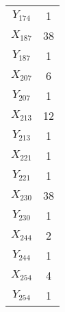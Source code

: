 \documentclass[a4paper,10pt]{article}
\begin{document}
\begin{center}
\begin{longtable}{cc}
$Y_{174}$ & 1 \\
$X_{187}$ & 38 \\
$Y_{187}$ & 1 \\
$X_{207}$ & 6 \\
$Y_{207}$ & 1 \\
$X_{213}$ & 12 \\
$Y_{213}$ & 1 \\
$X_{221}$ & 1 \\
$Y_{221}$ & 1 \\
$X_{230}$ & 38 \\
$Y_{230}$ & 1 \\
$X_{244}$ & 2 \\
$Y_{244}$ & 1 \\
$X_{254}$ & 4 \\
$Y_{254}$ & 1 \\
\end{longtable}
\end{center}
\end{document}
